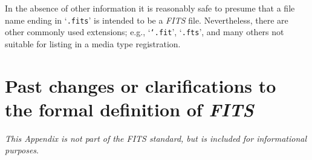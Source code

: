\documentclass[onecolumn]{aa}
\begin{document}
  In the absence of other information it is reasonably safe to presume
  that a file name ending in  `{\tt .fits}' is intended to be a {\em FITS\/} file.
  Nevertheless, there are other commonly used extensions; e.g., `{\tt`.fit}',
  `{\tt .fts}', and many others not suitable for listing in a media type
  registration.


 


\section{Past changes or clarifications to the formal definition of {\em FITS\/}}
\label{s:changes}   
{\em This Appendix is not part of the {\em FITS\/} standard, 
but  is included for
informational purposes}.  
\end{document}
